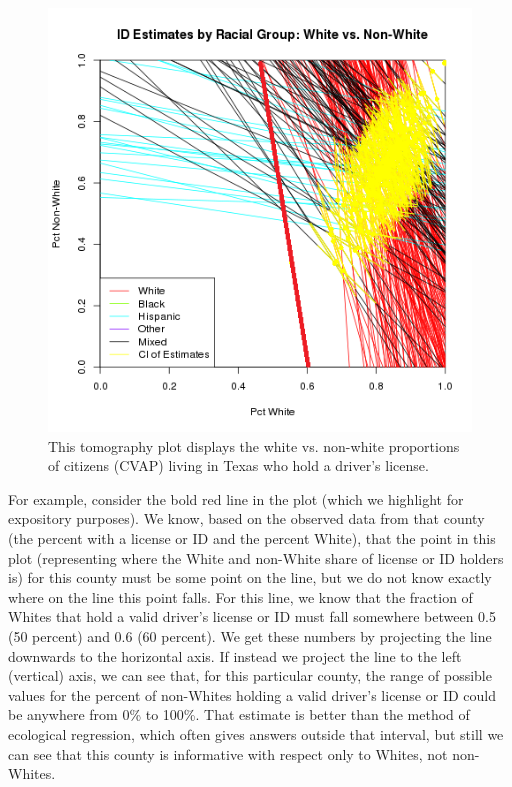 \documentclass[12pt]{article}
\begin{document}
\begin{figure}[htb]
\begin{centering}
\includegraphics[scale=.75]{figs/CVAP_f3_dl_white_ex.png}
\caption{\label{tomog}This tomography plot displays the white vs. non-white proportions of citizens (CVAP)
living in Texas who hold a driver's license.}
\end{centering}
\end{figure}

For example, consider the bold red line in the plot (which we
highlight for expository purposes).  We know, based on the observed
data from that county (the percent with a license or ID and the
percent White), that the point in this plot (representing where the
White and non-White share of license or ID holders is) for this county
must be some point on the line, but we do not know exactly where on
the line this point falls. For this line, we know that the fraction of
Whites that hold a valid driver's license or ID must fall somewhere
between 0.5 (50 percent) and 0.6 (60 percent). We get these numbers by
projecting the line downwards to the horizontal axis. If instead we
project the line to the left (vertical) axis, we can see that, for
this particular county, the range of possible values for the percent
of non-Whites holding a valid driver's license or ID could be anywhere
from 0\% to 100\%.  That estimate is better than the method of
ecological regression, which often gives answers outside that
interval, but still we can see that this county is informative with
respect only to Whites, not non-Whites.
\end{document}
